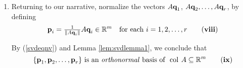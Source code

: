 \begin{enumerate}[label=\textbf{\arabic*.},leftmargin=*]
\begin{definition}{}{svddef1}
The real numbers $\sigma_{i}=\sqrt{\lambda_{i}}\overset{\text{(\textbf{iii})}}{=}\vectlength A\bar{\vect{q}_{i}}\vectlength $ for $i=1,2,\ldots,n$, are called the \textbf{singular values} of the matrix $A$. 
\end{definition}

Clearly $\sigma_{1},\sigma_{2},\ldots ,\sigma_{r}$ are the \emph{positive}
singular values of $A$. By (\ref{svdeqni}) we have 
\begin{equation}\label{svdeqnvii}
\sigma_{1}\geq \sigma _{2}\geq \cdots \geq \sigma_{r}>0 \qquad \mbox{and} \qquad \sigma_{i}=0 \mbox{ if } i>r \tag{\textbf{vii}}
\end{equation}

\noindent With (\ref{svdeqnvi}) this makes the following definitions depend
only upon $A$. 

\begin{definition}{}{svddef2}
Let $A$ be a real, $m\times n$ matrix of rank $r$, with positive singular
values $\sigma_{1}\geq \sigma_{2}\geq \cdots \geq \sigma_{r}>0$ and $\sigma_{i}=0$ if $i>r$. Define:

\begin{equation*}
D_{A}=\func{diag}(\sigma_{1},\ldots ,\sigma_{r})\quad
\qquad \mbox{and}\quad \qquad \Sigma_{A}=
\leftB 
\begin{array}{cc}
D_{A} & 0 \\ 
0 & 0
\end{array}
\rightB_{m\times n}
\end{equation*}

\noindent Here $\Sigma_{A}$ is in block form and is called the \textbf{singular matrix} of $A$.
\end{definition}

\noindent The singular values $\sigma_{i}$ and the matrices $D_{A}$ and $\Sigma_{A}$ will be referred to frequently below.

\noindent \item Returning to our narrative, normalize the vectors $A\textbf{q}_{1}$, $A\textbf{q}_{2},\ldots, A\textbf{q}_{r}$, by defining
\begin{equation}\label{svdeqnviii}
\vect{p}_{i}=\frac{1}{\vectlength A\vect{q}_{i}\vectlength }A\vect{q}_{i}\in \RR^{m} \quad \mbox{for each }
i=1,2,\ldots ,r \tag{\textbf{viii}}
\end{equation}

\noindent By (\ref{svdeqnv}) and Lemma \ref{lem:svdlemma1}, we conclude that
\begin{equation}\label{svdeqnix}
\{\vect{p}_{1},\vect{p}_{2},\ldots ,\vect{p}_{r}\} \mbox{ is an \emph{orthonormal} basis of } \func{col}A\subseteq \RR^{m}  \tag{\textbf{ix}}
\end{equation}


\end{enumerate}
